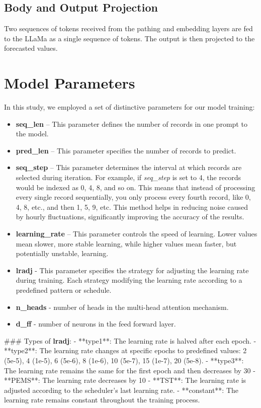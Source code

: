 \subsection{Body and Output Projection}
Two sequences of tokens received from the pathing and embedding layers are fed to the LLaMa as a single sequence of tokens. The output is then projected to the forecasted values. \\

\section{Model Parameters}

In this study, we employed a set of distinctive parameters for our model training:

\begin{itemize}
	\item \textbf{seq\_len} – This parameter defines the number of records in one prompt to the model.
	\item \textbf{pred\_len} – This parameter specifies the number of records to predict.
	\item \textbf{seq_step} – This parameter determines the interval at which records are selected during iteration. For example, if \textit{seq_step} is set to 4, the records would be indexed as 0, 4, 8, and so on. This means that instead of processing every single record sequentially, you only process every fourth record, like 0, 4, 8, etc., and then 1, 5, 9, etc. This method helps in reducing noise caused by hourly fluctuations, significantly improving the accuracy of the results.
	\item \textbf{learning\_rate} – This parameter controls the speed of learning. Lower values mean slower, more stable learning, while higher values mean faster, but potentially unstable, learning.
	\item \textbf{lradj} - This parameter specifies the strategy for adjusting the learning rate during training. Each strategy modifying the learning rate according to a predefined pattern or schedule.
	\item \textbf{n\_heads} - number of heads in the multi-head attention mechanism.
	\item \textbf{d\_ff} - number of neurons in the feed forward layer.
\end{itemize}

### Types of \textbf{lradj}:
- **type1**: The learning rate is halved after each epoch.
- **type2**: The learning rate changes at specific epochs to predefined values: 2 (5e-5), 4 (1e-5), 6 (5e-6), 8 (1e-6), 10 (5e-7), 15 (1e-7), 20 (5e-8).
- **type3**: The learning rate remains the same for the first epoch and then decreases by 30%
- **PEMS**: The learning rate decreases by 10%
- **TST**: The learning rate is adjusted according to the scheduler’s last learning rate.
- **constant**: The learning rate remains constant throughout the training process.

